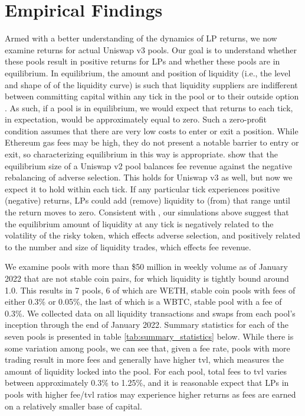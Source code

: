 \documentclass[11pt]{article}
\begin{document}
\section{Empirical Findings}\label{sec:5}

Armed with a better understanding of the dynamics of LP returns, we now examine returns for actual Uniswap v3 pools. Our goal is to understand whether these pools result in positive returns for LPs and whether these pools are in equilibrium. In equilibrium, the amount and position of liquidity (i.e., the level and shape of of the liquidity curve) is such that liquidity suppliers are indifferent between committing capital within any tick in the pool or to their outside option \citep{Lehar2021DecentralizedE}. As such, if a pool is in equilibrium, we would expect that returns to each tick, in expectation, would be approximately equal to zero. Such a zero-profit condition assumes that there are very low costs to enter or exit a position. While Ethereum gas fees may be high, they do not present a notable barrier to entry or exit, so characterizing equilibrium in this way is appropriate. \citet{Lehar2021DecentralizedE} show that the equilibrium size of a Uniswap v2 pool balances fee revenue against the negative rebalancing of adverse selection. This holds for Uniswap v3 as well, but now we expect it to hold within each tick. If any particular tick experiences positive (negative) returns, LPs could add (remove) liquidity to (from) that range until the return moves to zero. Consistent with \citet{Aoyagi2020LiquidityPB}, our simulations above suggest that the equilibrium amount of liquidity at any tick is negatively related to the volatility of the risky token, which effects adverse selection, and positively related to the number and size of liquidity trades, which effects fee revenue.

We examine pools with more than \$50 million in weekly volume as of January 2022 that are not stable coin pairs, for which liquidity is tightly bound around 1.0. This results in 7 pools, 6 of which are WETH, stable coin pools with fees of either 0.3\% or 0.05\%, the last of which is a WBTC, stable pool with a fee of 0.3\%. We collected data on all liquidity transactions and swaps from each pool's inception through the  end of January 2022. Summary statistics for each of the seven pools is presented in table \ref{tab:summary_statistics} below. While there is some variation among pools, we can see that, given a fee rate, pools with more trading result in more fees and generally have higher \gls{tvl}, which measures the amount of liquidity locked into the pool. For each pool, total fees to \gls{tvl} varies between approximately 0.3\% to 1.25\%, and it is reasonable expect that LPs in pools with higher fee/\gls{tvl} ratios may experience higher returns as fees are earned on a relatively smaller base of capital.
\end{document}
